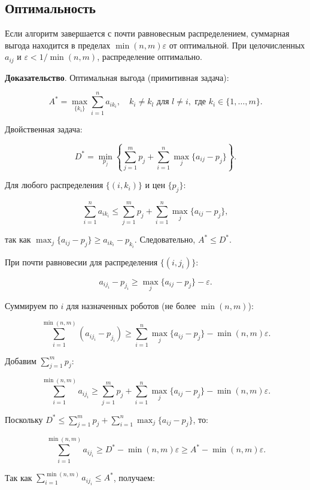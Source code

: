 \subsection{Оптимальность}
\begin{theorem}
\label{thm:auction_optimality}
Если алгоритм завершается с почти равновесным распределением, суммарная выгода находится в пределах \( \min(n, m) \varepsilon \) от оптимальной. При целочисленных \( a_{ij} \) и \( \varepsilon < 1/\min(n, m) \), распределение оптимально.
\end{theorem}

\textbf{Доказательство}. Оптимальная выгода (примитивная задача):

\[
A^* = \max_{\{k_i\}} \sum_{i=1}^n a_{i k_i}, \quad k_i \neq k_l \text{ для } l \neq i, \text{ где } k_i \in \{1, \ldots, m\}.
\]

Двойственная задача:

\[
D^* = \min_{p_j} \left\{ \sum_{j=1}^m p_j + \sum_{i=1}^n \max_j \{a_{ij} - p_j\} \right\}.
\]

Для любого распределения \( \{ (i, k_i) \} \) и цен \( \{ p_j \} \):

\[
\sum_{i=1}^n a_{i k_i} \leq \sum_{j=1}^m p_j + \sum_{i=1}^n \max_j \{a_{ij} - p_j\},
\]

так как \( \max_j \{a_{ij} - p_j\} \geq a_{i k_i} - p_{k_i} \). Следовательно, \( A^* \leq D^* \).

При почти равновесии для распределения \( \{ (i, j_i) \} \):

\[
a_{i j_i} - p_{j_i} \geq \max_j \{a_{ij} - p_j\} - \varepsilon.
\]

Суммируем по \( i \) для назначенных роботов (не более \( \min(n, m) \)):

\[
\sum_{i=1}^{\min(n, m)} (a_{i j_i} - p_{j_i}) \geq \sum_{i=1}^n \max_j \{a_{ij} - p_j\} - \min(n, m) \varepsilon.
\]

Добавим \( \sum_{j=1}^m p_j \):

\[
\sum_{i=1}^{\min(n, m)} a_{i j_i} \geq \sum_{j=1}^m p_j + \sum_{i=1}^n \max_j \{a_{ij} - p_j\} - \min(n, m) \varepsilon.
\]

Поскольку \( D^* \leq \sum_{j=1}^m p_j + \sum_{i=1}^n \max_j \{a_{ij} - p_j\} \), то:

\[
\sum_{i=1}^{\min(n, m)} a_{i j_i} \geq D^* - \min(n, m) \varepsilon \geq A^* - \min(n, m) \varepsilon.
\]

Так как \( \sum_{i=1}^{\min(n, m)} a_{i j_i} \leq A^* \), получаем:

